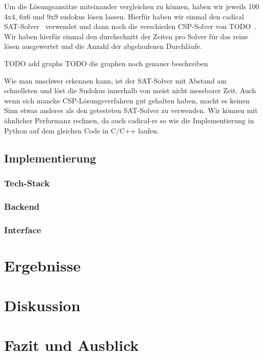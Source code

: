 \documentclass[12pt,a4paper]{article}
\begin{document}
Um die Lösungsansätze miteinander vergleichen zu können, haben wir jeweils 100 4x4, 6x6 und 9x9 sudokus lösen lassen.
Hierfür haben wir einmal den cadical SAT-Solver~\cite{TODO} verwendet und dann noch die verschieden CSP-Solver von TODO~\cite{TODO}.
Wir haben hierfür einmal den durchschnitt der Zeiten pro Solver für das reine lösen ausgewertet und die Anzahl der abgelaufenen Durchläufe.

TODO add graphs
TODO die graphen noch genauer beschreiben

Wie man unschwer erkennen kann, ist der SAT-Solver mit Abstand am schnellsten und löst die Sudokus innerhalb von meist nicht messbarer Zeit.
Auch wenn sich manche CSP-Lösungsverfahren gut gehalten haben, macht es keinen Sinn etwas anderes als den getesteten SAT-Solver zu verwenden.
Wir können mit ähnlicher Performanz rechnen, da auch cadical-rs so wie die Implementierung in Python auf dem gleichen Code in C/C++ laufen.

\subsection{Implementierung}

\subsubsection{Tech-Stack}


\subsubsection{Backend}
\subsubsection{Interface}

\section{Ergebnisse}

\section{Diskussion}

\section{Fazit und Ausblick}



\end{document}
